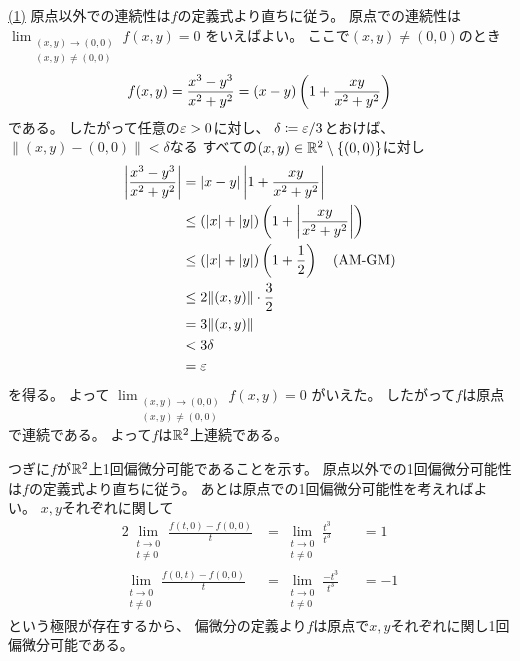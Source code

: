 \documentclass[report]{jlreq}
\begin{document}
\begin{answer}
    \uline{(1)} \quad
    原点以外での連続性は$f$の定義式より直ちに従う。
    原点での連続性は
    $\lim_{\substack{(x, y) \to (0, 0) \\ (x, y) \neq (0, 0)}} f(x, y) = 0$
    をいえばよい。
    ここで$(x, y) \neq (0, 0)$のとき
    \begin{equation}
        f(x, y)
            = \frac{x^3 - y^3}{x^2 + y^2}
            = (x - y) \left({
                1 + \frac{xy}{x^2 + y^2}
            }\right)
    \end{equation}
    である。
    したがって任意の$\varepsilon > 0$に対し、
    $\delta \coloneqq \varepsilon / 3$とおけば、
    $\| (x, y) - (0, 0) \| < \delta$なる
    すべての$(x, y) \in \mathbb{R}^2 \setminus \{(0, 0)\}$に対し
    \begin{alignat}{1}
        \left|
            \frac{x^3 - y^3}{x^2 + y^2}
        \right|
            &= |x - y| \left|
                1 + \frac{xy}{x^2 + y^2}
            \right| \\
            &\le (|x| + |y|) \left({
                1 + \left| \frac{xy}{x^2 + y^2} \right|
            }\right) \\
            &\le (|x| + |y|) \left({
                1 + \frac{1}{2}
            }\right)
                \quad
                (\text{AM-GM}) \\
            &\le 2 \| (x, y) \| \cdot \frac{3}{2} \\
            &= 3 \| (x, y) \| \\
            &< 3 \delta \\
            &= \varepsilon
    \end{alignat}
    を得る。
    よって
    $\lim_{\substack{(x, y) \to (0, 0) \\ (x, y) \neq (0, 0)}} f(x, y) = 0$
    がいえた。
    したがって$f$は原点で連続である。
    よって$f$は$\mathbb{R}^2$上連続である。

    つぎに$f$が$\mathbb{R}^2$上1回偏微分可能であることを示す。
    原点以外での1回偏微分可能性は$f$の定義式より直ちに従う。
    あとは原点での1回偏微分可能性を考えればよい。
    $x, y$それぞれに関して
    \begin{alignat}{2}
        \lim_{\substack{t \to 0 \\ t \neq 0}}
            \frac{f(t, 0) - f(0, 0)}{t}
            &= \lim_{\substack{t \to 0 \\ t \neq 0}}
                \frac{t^3}{t^3}
            &&= 1 \\
        \lim_{\substack{t \to 0 \\ t \neq 0}}
            \frac{f(0, t) - f(0, 0)}{t}
            &= \lim_{\substack{t \to 0 \\ t \neq 0}}
                \frac{-t^3}{t^3}
            &&= -1
    \end{alignat}
    という極限が存在するから、
    偏微分の定義より$f$は原点で$x, y$それぞれに関し1回偏微分可能である。


\end{answer}
\end{document}
